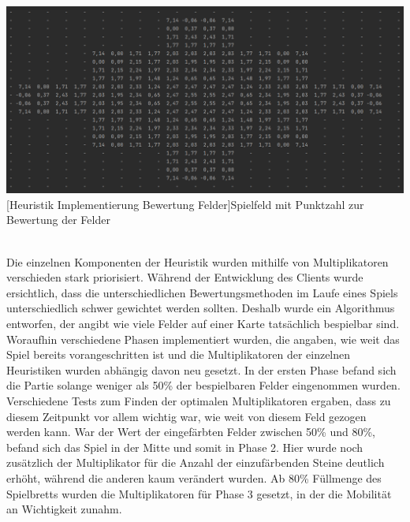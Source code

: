 \documentclass[12pt,a4paper,bibliography=totocnumbered,listof=totocnumbered]{article}
\begin{document}
\vspace{1em}
\begin{minipage}{\linewidth}
	\centering
	\includegraphics[width=\linewidth]{pics/heuristics_implementation_field_values_matrix.png}
	[Heuristik Implementierung Bewertung Felder]{Spielfeld mit Punktzahl zur Bewertung der Felder}
	\label{fig:example_heuristics_implementation_field_values_matrix}
\end{minipage} 
\\

Die einzelnen Komponenten der Heuristik wurden mithilfe von Multiplikatoren verschieden stark priorisiert. Während der Entwicklung des Clients wurde ersichtlich, dass die unterschiedlichen Bewertungsmethoden im Laufe eines Spiels unterschiedlich schwer gewichtet werden sollten. Deshalb wurde ein Algorithmus entworfen, der angibt wie viele Felder auf einer Karte tatsächlich bespielbar sind. Woraufhin verschiedene Phasen implementiert wurden, die angaben, wie weit das Spiel bereits vorangeschritten ist und die Multiplikatoren der einzelnen Heuristiken wurden abhängig davon neu gesetzt. In der ersten Phase befand sich die Partie solange weniger als 50\% der bespielbaren Felder eingenommen wurden. Verschiedene Tests zum Finden der optimalen Multiplikatoren ergaben, dass zu diesem Zeitpunkt vor allem wichtig war, wie weit von diesem Feld gezogen werden kann. War der Wert der eingefärbten Felder zwischen 50\% und 80\%, befand sich das Spiel in der Mitte und somit in Phase 2. Hier wurde noch zusätzlich der Multiplikator für die Anzahl der einzufärbenden Steine deutlich erhöht, während die anderen kaum verändert wurden. Ab 80\% Füllmenge des Spielbretts wurden die Multiplikatoren für Phase 3 gesetzt, in der die Mobilität an Wichtigkeit zunahm.
 
\newpage
\end{document}
